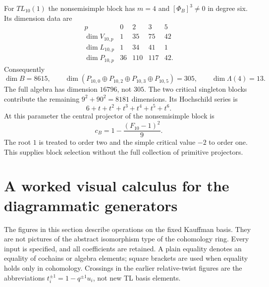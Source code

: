 \documentclass[a4paper,11pt,oneside,reqno]{amsart}
\theoremstyle{definition}
\numberwithin{equation}{section}
\begin{document}
	For $TL_{10}(1)$ the nonsemisimple block has $m=4$ and
	$[\Phi_B]^3\ne0$ in degree six.  Its dimension data are
	\[
	\begin{array}{c|rrrr}
		p&0&2&3&5\\\hline
		\dim V_{10,p}&1&35&75&42\\
		\dim L_{10,p}&1&34&41&1\\
		\dim P_{10,p}&36&110&117&42.
	\end{array}
	\]
	Consequently
	\[
	\dim B=8615,\qquad
	\dim(P_{10,0}\oplus P_{10,2}\oplus P_{10,3}\oplus P_{10,5})=305,
	\qquad \dim\Lambda(4)=13.
	\]
	The full algebra has dimension $16796$, not $305$.
	The two critical singleton blocks contribute the remaining
	$9^2+90^2=8181$ dimensions.  Its Hochschild series is
	\[
	6+t+t^2+t^3+t^4+t^5+t^6.
	\]
	At this parameter the central projector of the nonsemisimple block is
	\[
	c_B=1-\frac{(F_{10}-1)^2}{9}.
	\]
	The root $1$ is treated to order two and the simple critical value
	$-2$ to order one.  This supplies block selection without the full
	collection of primitive projectors.
	
	\section{A worked visual calculus for the diagrammatic generators}
\label{vis:calculus}
The figures in this section describe operations on the fixed Kauffman
basis. They are not pictures of the abstract isomorphism type of the
cohomology ring. Every input is specified, and all coefficients are
retained. A plain equality denotes an equality of cochains or algebra
elements; square brackets are used when equality holds only in
cohomology. Crossings in the earlier relative-twist figures are the
abbreviations $t_i^{\pm1}=1-q^{\pm1}u_i$, not new TL basis elements.
\end{document}

